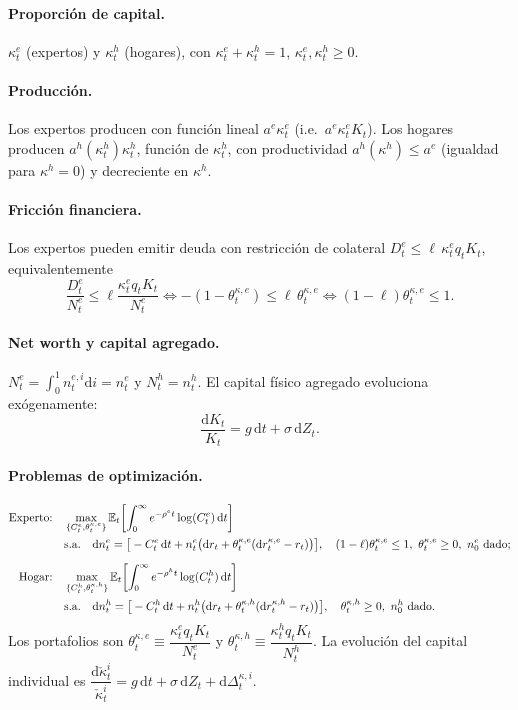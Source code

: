 \documentclass[11pt]{article}
\theoremstyle{definition}
\theoremstyle{remark}
\newcommand{\dd}{\mathrm{d}}
\newcommand{\E}{\mathbb{E}}
\newcommand{\aE}{a^{e}}
\newcommand{\aH}{a^{h}}
\newcommand{\re}{\rho^{e}}
\newcommand{\rh}{\rho^{h}}
\newcommand{\thke}{\theta_t^{\kappa,e}}
\newcommand{\thkh}{\theta_t^{\kappa,h}}
\begin{document}
\paragraph{Proporción de capital.} $\kappa_t^{e}$ (expertos) y $\kappa_t^{h}$ (hogares), con $\kappa_t^{e}+\kappa_t^{h}=1$, $\kappa_t^{e},\kappa_t^{h}\ge0$.

\paragraph{Producción.} Los expertos producen con función lineal $\aE\kappa_t^{e}$ (i.e.\ $\aE\kappa_t^{e}K_t$). Los hogares producen $\aH(\kappa_t^{h})\kappa_t^{h}$, función de $\kappa_t^{h}$, con productividad $\aH(\kappa^{h})\le\aE$ (igualdad para $\kappa^{h}=0$) y decreciente en $\kappa^{h}$.

\paragraph{Fricción financiera.} Los expertos pueden emitir deuda con restricción de colateral $D_t^{e}\le\ell\,\kappa_t^{e}q_tK_t$, equivalentemente
\begin{equation}
\frac{D_t^{e}}{N_t^{e}}\le\ell\frac{\kappa_t^{e}q_tK_t}{N_t^{e}}
\iff -(1-\thke)\le\ell\,\thke
\iff (1-\ell)\thke\le1.
\end{equation}

\paragraph{Net worth y capital agregado.} $N_t^{e}=\int_0^1 n_t^{e,i}\dd i=n_t^{e}$ y $N_t^{h}=n_t^{h}$. El capital físico agregado evoluciona exógenamente:
\begin{equation}
\frac{\dd K_t}{K_t}=g\,\dd t+\sigma\,\dd Z_t.
\end{equation}

\paragraph{Problemas de optimización.}
\begin{align}
\text{Experto:}\quad &\max_{\{C_t^{e},\thke\}}\E_t\!\left[\int_0^\infty e^{-\re t}\log(C_t^{e})\,\dd t\right]\\
&\text{s.a.}\quad \dd n_t^{e}=\big[-C_t^{e}\,\dd t+n_t^{e}\big(\dd r_t+\thke(\dd r_t^{\kappa,e}-r_t)\big)\big],\quad (1-\ell)\thke\le1,\ \thke\ge0,\ n_0^{e}\ \text{dado};\notag\\[6pt]
\text{Hogar:}\quad &\max_{\{C_t^{h},\thkh\}}\E_t\!\left[\int_0^\infty e^{-\rh t}\log(C_t^{h})\,\dd t\right]\\
&\text{s.a.}\quad \dd n_t^{h}=\big[-C_t^{h}\,\dd t+n_t^{h}\big(\dd r_t+\thkh(\dd r_t^{\kappa,h}-r_t)\big)\big],\quad \thkh\ge0,\ n_0^{h}\ \text{dado}.\notag
\end{align}
Los portafolios son $\thke\equiv\dfrac{\kappa_t^{e}q_tK_t}{N_t^{e}}$ y $\thkh\equiv\dfrac{\kappa_t^{h}q_tK_t}{N_t^{h}}$. La evolución del capital individual es
$\dfrac{\dd\check\kappa_t^{i}}{\check\kappa_t^{i}}=g\,\dd t+\sigma\,\dd Z_t+\dd\Delta_t^{\kappa,i}$.
\end{document}
